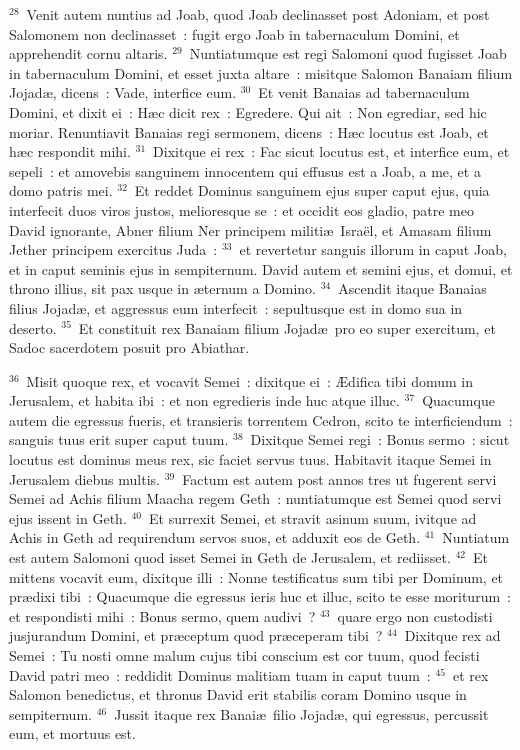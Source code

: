 ${}^{28}$~Venit autem nuntius ad Joab, quod Joab declinasset post Adoniam, et post Salomonem non declinasset~: fugit ergo Joab in tabernaculum Domini, et apprehendit cornu altaris.
${}^{29}$~Nuntiatumque est regi Salomoni quod fugisset Joab in tabernaculum Domini, et esset juxta altare~: misitque Salomon Banaiam filium Jojad\ae , dicens~: Vade, interfice eum.
${}^{30}$~Et venit Banaias ad tabernaculum Domini, et dixit ei~: H\ae c dicit rex~: Egredere. Qui ait~: Non egrediar, sed hic moriar. Renuntiavit Banaias regi sermonem, dicens~: H\ae c locutus est Joab, et h\ae c respondit mihi.
${}^{31}$~Dixitque ei rex~: Fac sicut locutus est, et interfice eum, et sepeli~: et amovebis sanguinem innocentem qui effusus est a Joab, a me, et a domo patris mei.
${}^{32}$~Et reddet Dominus sanguinem ejus super caput ejus, quia interfecit duos viros justos, melioresque se~: et occidit eos gladio, patre meo David ignorante, Abner filium Ner principem militi\ae\ Isra\"el, et Amasam filium Jether principem exercitus Juda~:
${}^{33}$~et revertetur sanguis illorum in caput Joab, et in caput seminis ejus in sempiternum. David autem et semini ejus, et domui, et throno illius, sit pax usque in \ae ternum a Domino.
${}^{34}$~Ascendit itaque Banaias filius Jojad\ae , et aggressus eum interfecit~: sepultusque est in domo sua in deserto.
${}^{35}$~Et constituit rex Banaiam filium Jojad\ae\ pro eo super exercitum, et Sadoc sacerdotem posuit pro Abiathar.


${}^{36}$~Misit quoque rex, et vocavit Semei~: dixitque ei~: \AE difica tibi domum in Jerusalem, et habita ibi~: et non egredieris inde huc atque illuc.
${}^{37}$~Quacumque autem die egressus fueris, et transieris torrentem Cedron, scito te interficiendum~: sanguis tuus erit super caput tuum.
${}^{38}$~Dixitque Semei regi~: Bonus sermo~: sicut locutus est dominus meus rex, sic faciet servus tuus. Habitavit itaque Semei in Jerusalem diebus multis.
${}^{39}$~Factum est autem post annos tres ut fugerent servi Semei ad Achis filium Maacha regem Geth~: nuntiatumque est Semei quod servi ejus issent in Geth.
${}^{40}$~Et surrexit Semei, et stravit asinum suum, ivitque ad Achis in Geth ad requirendum servos suos, et adduxit eos de Geth.
${}^{41}$~Nuntiatum est autem Salomoni quod isset Semei in Geth de Jerusalem, et rediisset.
${}^{42}$~Et mittens vocavit eum, dixitque illi~: Nonne testificatus sum tibi per Dominum, et pr\ae dixi tibi~: Quacumque die egressus ieris huc et illuc, scito te esse moriturum~: et respondisti mihi~: Bonus sermo, quem audivi~?
${}^{43}$~quare ergo non custodisti jusjurandum Domini, et pr\ae ceptum quod pr\ae ceperam tibi~?
${}^{44}$~Dixitque rex ad Semei~: Tu nosti omne malum cujus tibi conscium est cor tuum, quod fecisti David patri meo~: reddidit Dominus malitiam tuam in caput tuum~:
${}^{45}$~et rex Salomon benedictus, et thronus David erit stabilis coram Domino usque in sempiternum.
${}^{46}$~Jussit itaque rex Banai\ae\ filio Jojad\ae , qui egressus, percussit eum, et mortuus est.

